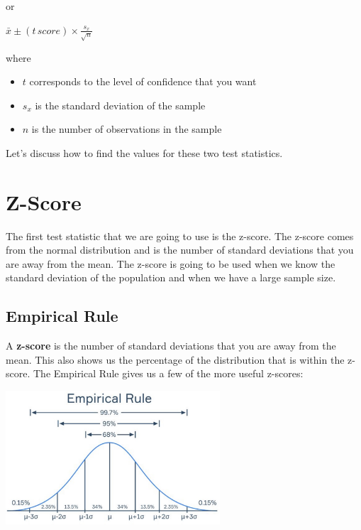 \documentclass[
  letterpaper,
  DIV=11,
  numbers=noendperiod]{scrreprt}
\providecommand{\tightlist}{%
  \setlength{\itemsep}{0pt}\setlength{\parskip}{0pt}}\usepackage{longtable,booktabs,array}
\begin{document}
or

\(\displaystyle{\bar{x} \pm (t \, score) \times \frac{s_x}{\sqrt{n}}}\)

where

\begin{itemize}
\tightlist
\item
  \(t\) corresponds to the level of confidence that you want
\item
  \(s_x\) is the standard deviation of the sample
\item
  \(n\) is the number of observations in the sample
\end{itemize}

Let's discuss how to find the values for these two test statistics.

\section*{Z-Score}\label{z-score}


The first test statistic that we are going to use is the z-score. The
z-score comes from the normal distribution and is the number of standard
deviations that you are away from the mean. The z-score is going to be
used when we know the standard deviation of the population and when we
have a large sample size.

\subsection*{Empirical Rule}\label{empirical-rule}

A \textbf{z-score} is the number of standard deviations that you are
away from the mean. This also shows us the percentage of the
distribution that is within the z-score. The Empirical Rule gives us a
few of the more useful z-scores:

\includegraphics[width=0.6\textwidth,height=\textheight]{./images/EPCI_1.jpg}
\end{document}
